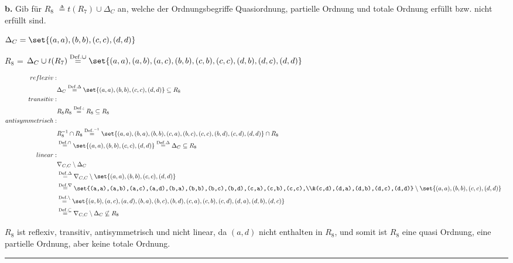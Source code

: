 \documentclass[10pt,leqno ]{article}
\DeclarePairedDelimiter\set\{\}
\newcommand\customeq[1]{\overset{\mathrm{#1}}{=}}
\theoremstyle{definition}
\newenvironment{solution}[1][L]{\begin{doublespace}\textbf{#1.}\quad }{\ \rule{0.5em}{0.5em}\end{doublespace}}
\begin{document}
\begin{solution}[b]
Gib für $R_8$ \( \triangleq t(R_7) \cup \Delta_C \) an, welche der Ordnungsbegriffe Quasiordnung, partielle Ordnung und totale Ordnung erfüllt bzw. nicht erfüllt sind.

\( \Delta_C = \set{(a,a),(b,b),(c,c),(d,d)} \)

$R_8$ = \( \Delta_C \cup t(R_7)\customeq{Def. \cup} \set{(a,a),(a,b),(a,c),(b,b),(c,b),(c,c),(d,b),(d,c),(d,d)} \)

\begin{equation*}
   \begin{aligned}
   reflexiv: \\
   &\Delta_C \customeq{Def. \Delta} \set{(a,a),(b,b),(c,c),(d,d)} \subseteq{}R_8\\
   transitiv:\\ 
   & R_8R_8 \customeq{Def. ;} R_8\subseteq R_8\\
   antisymmetrisch:\\
   & R_8^{-1} \cap R_8 \customeq{Def. ^{-1}} \set{(a,a),(b,a),(b,b),(c,a),(b,c),(c,c),(b,d),(c,d),(d,d)} \cap R_8\\
   &\customeq{Def. \cap} \set{(a,a),(b,b),(c,c),(d,d)} \customeq{Def. \Delta} \Delta_C \subseteq{}R_8\\
   linear:\\
   &\nabla_{C,C} \setminus \Delta_C\\
   &\customeq{Def. \Delta} \nabla_{C,C} \setminus \set{(a,a),(b,b),(c,c),(d,d)}\\
   &\customeq{Def. \nabla} \set{(a,a),(a,b),(a,c),(a,d),(b,a),(b,b),(b,c),(b,d),(c,a),(c,b),(c,c),\\&(c,d),(d,a),(d,b),(d,c),(d,d)} \setminus \set{(a,a),(b,b),(c,c),(d,d)}\\
   &\customeq{Def. \setminus} \set{(a, b),(a, c),(a, d),(b, a),(b, c),(b, d),(c, a),(c, b),(c, d),(d, a),(d, b),(d, c)}\\
   &\customeq{Def. \subseteq}\nabla_{C,C} \setminus \Delta_C \not \subseteq R_8\\
    \end{aligned}
\end{equation*}

\(R_8\) ist reflexiv, transitiv, antisymmetrisch und nicht linear, da $(a,d)$ nicht enthalten in $R_8$, und somit ist $R_8$ eine quasi Ordnung, eine partielle Ordnung, aber keine totale Ordnung.
\end{solution}
\end{document}
